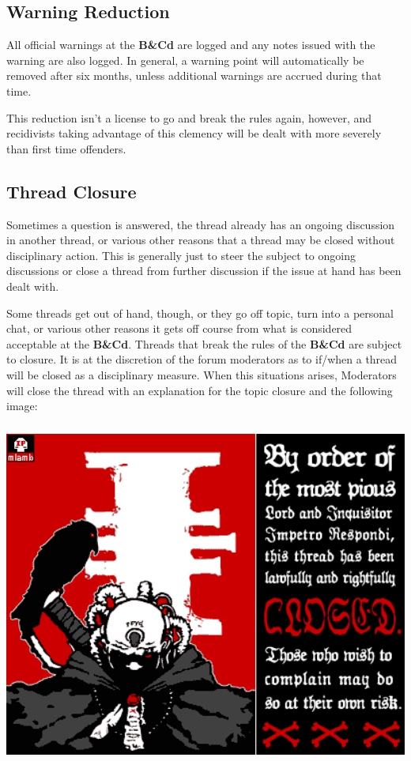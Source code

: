 \documentclass[12pt]{article}
\newcommand{\BnC}{{\textbf{B\&Cd}}}%
\begin{document}
\subsection{Warning Reduction}

All official warnings at the {\BnC} are logged and any notes issued with 
the warning are also logged. In general, a warning point will 
automatically be removed after six months, unless additional warnings 
are accrued during that time.

This reduction isn't a license to go and break the rules again, 
however, and recidivists taking advantage of this clemency will be 
dealt with more severely than first time offenders.

\subsection{Thread Closure}

Sometimes a question is answered, the thread already has an ongoing 
discussion in another thread, or various other reasons that a thread 
may be closed without disciplinary action. This is generally just to 
steer the subject to ongoing discussions or close a thread from further 
discussion if the issue at hand has been dealt with.

Some threads get out of hand, though, or they go off topic, turn into a 
personal chat, or various other reasons it gets off course from what is 
considered acceptable at the {\BnC}. Threads that break the rules of the 
{\BnC} are subject to closure. It is at the discretion of the forum 
moderators as to if/when a thread will be closed as a disciplinary 
measure. When this situations arises, Moderators will close the thread 
with an explanation for the topic closure and the following image:

\includegraphics[width=400pt, height=322pt]{closedtopic.png}
\end{document}
